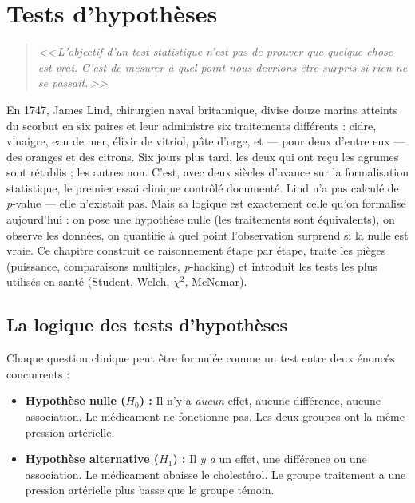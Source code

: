 \chapter{Tests d'hypoth\`eses}
\label{ch:tests-hypotheses}

\begin{quote}
\emph{<<\,L'objectif d'un test statistique n'est pas de prouver que quelque chose est vrai. C'est de mesurer \`a quel point nous devrions \^etre surpris si rien ne se passait.\,>>}
\end{quote}

En 1747, James Lind, chirurgien naval britannique, divise douze marins atteints du scorbut en six paires et leur administre six traitements différents : cidre, vinaigre, eau de mer, élixir de vitriol, pâte d'orge, et --- pour deux d'entre eux --- des oranges et des citrons. Six jours plus tard, les deux qui ont reçu les agrumes sont rétablis ; les autres non. C'est, avec deux siècles d'avance sur la formalisation statistique, le premier essai clinique contrôlé documenté. Lind n'a pas calculé de \emph{p}-value --- elle n'existait pas. Mais sa logique est exactement celle qu'on formalise aujourd'hui : on pose une hypothèse nulle (les traitements sont équivalents), on observe les données, on quantifie à quel point l'observation surprend si la nulle est vraie. Ce chapitre construit ce raisonnement étape par étape, traite les pièges (puissance, comparaisons multiples, \emph{p}-hacking) et introduit les tests les plus utilisés en santé (Student, Welch, $\chi^2$, McNemar).

\section{La logique des tests d'hypoth\`eses}

Chaque question clinique peut \^etre formul\'ee comme un test entre deux \'enonc\'es concurrents :

\begin{itemize}
  \item \textbf{Hypoth\`ese nulle ($H_0$) :} Il n'y a \emph{aucun} effet, aucune diff\'erence, aucune association. Le m\'edicament ne fonctionne pas. Les deux groupes ont la m\^eme pression art\'erielle.
  \item \textbf{Hypoth\`ese alternative ($H_1$) :} Il \emph{y a} un effet, une diff\'erence ou une association. Le m\'edicament abaisse le cholest\'erol. Le groupe traitement a une pression art\'erielle plus basse que le groupe t\'emoin.
\end{itemize}

